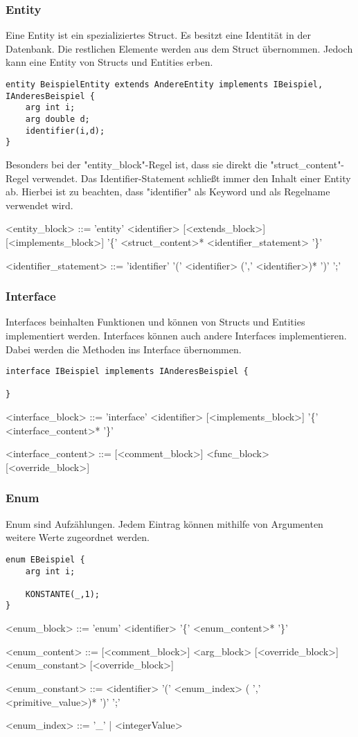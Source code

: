 \documentclass[./einleitung.tex]{subfiles}
\begin{document}
\subsubsection{Entity}
Eine Entity ist ein spezializiertes Struct. Es besitzt eine Identität in der Datenbank. Die restlichen Elemente werden aus dem Struct übernommen. Jedoch kann eine Entity von Structs und Entities erben.
\begin{lstlisting}
entity BeispielEntity extends AndereEntity implements IBeispiel, IAnderesBeispiel {
    arg int i;
    arg double d;
    identifier(i,d);
}
\end{lstlisting}
Besonders bei der "entity_block"-Regel ist, dass sie direkt die "struct_content"-Regel verwendet. Das Identifier-Statement schließt immer den Inhalt einer Entity ab. Hierbei ist zu beachten, dass "identifier" als Keyword und als Regelname verwendet wird.
\begin{grammar}
<entity_block> ::= 'entity' <identifier> [<extends_block>] [<implements_block>] '\{' <struct_content>* <identifier_statement> '\}' 

<identifier_statement> ::= 'identifier' '(' <identifier> (',' <identifier>)* ')' ';'
\end{grammar}

\subsubsection{Interface}
Interfaces beinhalten Funktionen und können von Structs und Entities implementiert werden.
Interfaces können auch andere Interfaces implementieren. Dabei werden die Methoden ins Interface übernommen.
\begin{lstlisting}
interface IBeispiel implements IAnderesBeispiel {

}
\end{lstlisting}
\begin{grammar}
<interface_block> ::= 'interface' <identifier> [<implements_block>] '\{' <interface_content>* '\}'

<interface_content> ::= [<comment_block>] <func_block> [<override_block>]
\end{grammar}

\subsubsection{Enum}
Enum sind Aufzählungen. Jedem Eintrag können mithilfe von Argumenten weitere Werte zugeordnet werden.
\begin{lstlisting}
enum EBeispiel {
    arg int i;
    
    KONSTANTE(_,1);
}
\end{lstlisting}
\begin{grammar}
<enum_block> ::= 'enum' <identifier> '\{' <enum_content>* '\}'

<enum_content> ::= [<comment_block>] <arg_block> [<override_block>]
 <enum_constant> [<override_block>]

<enum_constant> ::= <identifier> '(' <enum_index> ( ',' <primitive_value>)* ')' ';'

<enum_index> ::= '_' | <integerValue>
\end{grammar}



\end{document}
